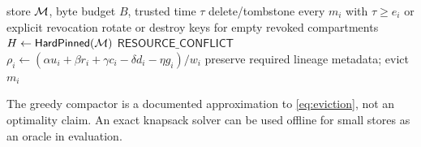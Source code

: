 \begin{algorithm}[t]
\caption{MemScope policy-aware compaction}
\label{alg:compact}
\begin{algorithmic}[1]
\Require store $\mathcal{M}$, byte budget $B$, trusted time $\tau$
\State delete/tombstone every $m_i$ with $\tau\ge e_i$ or explicit revocation
\State rotate or destroy keys for empty revoked compartments
 \State \Return \EndIf
\State $H\gets\mathsf{HardPinned}(\mathcal{M})$
 \State \Return $\mathsf{RESOURCE\_CONFLICT}$ \EndIf
{}
  \State $\rho_i\gets(\alpha u_i+\beta r_i+\gamma c_i-\delta d_i-\eta g_i)/w_i$
\EndFor
{}
  \State preserve required lineage metadata; evict $m_i$
   \State \Return \EndIf
\EndFor
\end{algorithmic}
\end{algorithm}

The greedy compactor is a documented approximation to \cref{eq:eviction}, not an optimality claim. An exact knapsack solver can be used offline for small stores as an oracle in evaluation.
